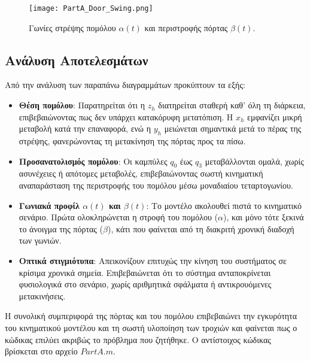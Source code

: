 \documentclass[a4paper,12pt]{report}
\begin{document}
\begin{figure}[H]
    \centering
    \begin{minipage}{0.48\textwidth}
        \centering
        \texttt{[image: PartA\_Door\_Swing.png]}
        \caption{Γωνίες στρέψης πομόλου $\alpha(t)$ και περιστροφής πόρτας $\beta(t)$.}
        \label{fig:angle_profiles}
    \end{minipage}
    \hfill
\end{figure}

\vspace{0.2cm}

\subsection{Ανάλυση Αποτελεσμάτων}

Από την ανάλυση των παραπάνω διαγραμμάτων προκύπτουν τα εξής:

\begin{itemize}
    \item \textbf{Θέση πομόλου}: Παρατηρείται ότι η $z_h$ διατηρείται σταθερή καθ’ όλη τη διάρκεια, επιβεβαιώνοντας πως δεν υπάρχει κατακόρυφη μετατόπιση. Η $x_h$ εμφανίζει μικρή μεταβολή κατά την επαναφορά, ενώ η $y_h$ μειώνεται σημαντικά μετά το πέρας της στρέψης, φανερώνοντας τη μετακίνηση της πόρτας προς τα πίσω.
    
    \item \textbf{Προσανατολισμός πομόλου}: Οι καμπύλες $q_0$ έως $q_3$ μεταβάλλονται ομαλά, χωρίς ασυνέχειες ή απότομες μεταβολές, επιβεβαιώνοντας σωστή κινηματική αναπαράσταση της περιστροφής του πομόλου μέσω μοναδιαίου τεταρτογωνίου.

    \item \textbf{Γωνιακά προφίλ $\alpha(t)$ και $\beta(t)$}: Το μοντέλο ακολουθεί πιστά το κινηματικό σενάριο. Πρώτα ολοκληρώνεται η στροφή του πομόλου ($\alpha$), και μόνο τότε ξεκινά το άνοιγμα της πόρτας ($\beta$), κάτι που φαίνεται από τη διακριτή χρονική διαδοχή των γωνιών.

    \item \textbf{Οπτικά στιγμιότυπα}: Απεικονίζουν επιτυχώς την κίνηση του συστήματος σε κρίσιμα χρονικά σημεία. Επιβεβαιώνεται ότι το σύστημα ανταποκρίνεται φυσιολογικά στο σενάριο, χωρίς αριθμητικά σφάλματα ή αντικρουόμενες μετακινήσεις.
\end{itemize}

\hspace{-0.6cm}Η συνολική συμπεριφορά της πόρτας και του πομόλου επιβεβαιώνει την εγκυρότητα του κινηματικού μοντέλου και τη σωστή υλοποίηση των τροχιών και φαίνεται πως ο κώδικας επιλύει ακριβώς το πρόβλημα που ζητήθηκε. Ο αντίστοιχος κώδικας βρίσκεται στο αρχείο \(PartA.m\).
\end{document}
